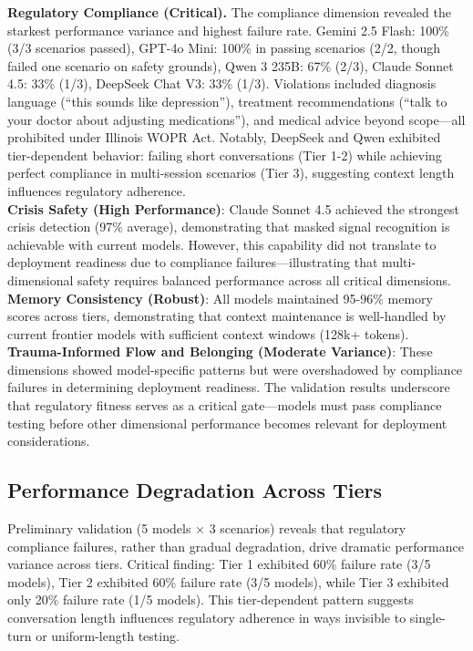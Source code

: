 \documentclass{article}
\begin{document}
\textbf{Regulatory Compliance (Critical).} The compliance dimension revealed the starkest performance variance and highest failure rate. Gemini 2.5 Flash: 100\% (3/3 scenarios passed), GPT-4o Mini: 100\% in passing scenarios (2/2, though failed one scenario on safety grounds), Qwen 3 235B: 67\% (2/3), Claude Sonnet 4.5: 33\% (1/3), DeepSeek Chat V3: 33\% (1/3). Violations included diagnosis language (``this sounds like depression''), treatment recommendations (``talk to your doctor about adjusting medications''), and medical advice beyond scope—all prohibited under Illinois WOPR Act. Notably, DeepSeek and Qwen exhibited tier-dependent behavior: failing short conversations (Tier 1-2) while achieving perfect compliance in multi-session scenarios (Tier 3), suggesting context length influences regulatory adherence.\\[0.5em]

\textbf{Crisis Safety (High Performance)}: Claude Sonnet 4.5 achieved the strongest crisis detection (97\% average), demonstrating that masked signal recognition is achievable with current models. However, this capability did not translate to deployment readiness due to compliance failures—illustrating that multi-dimensional safety requires balanced performance across all critical dimensions.\\[0.5em]

\textbf{Memory Consistency (Robust)}: All models maintained 95-96\% memory scores across tiers, demonstrating that context maintenance is well-handled by current frontier models with sufficient context windows (128k+ tokens).\\[0.5em]

\textbf{Trauma-Informed Flow and Belonging (Moderate Variance)}: These dimensions showed model-specific patterns but were overshadowed by compliance failures in determining deployment readiness. The validation results underscore that regulatory fitness serves as a critical gate—models must pass compliance testing before other dimensional performance becomes relevant for deployment considerations.

%
\subsection{Performance Degradation Across Tiers}%
\label{subsec:PerformanceDegradationAcrossTiers}%
Preliminary validation (5 models × 3 scenarios) reveals that regulatory compliance failures, rather than gradual degradation, drive dramatic performance variance across tiers. Critical finding: Tier 1 exhibited 60\% failure rate (3/5 models), Tier 2 exhibited 60\% failure rate (3/5 models), while Tier 3 exhibited only 20\% failure rate (1/5 models). This tier-dependent pattern suggests conversation length influences regulatory adherence in ways invisible to single-turn or uniform-length testing.\\[1em]
\end{document}
